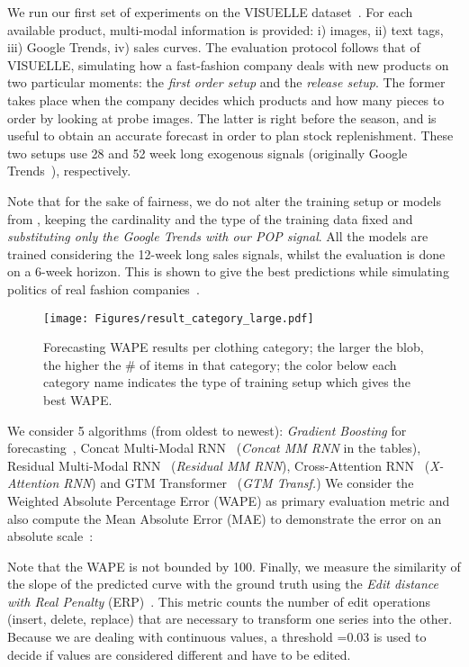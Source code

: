 \documentclass[runningheads]{llncs}
\newcommand{\snamebig}[0] {POP\xspace}
\begin{document}
We run our first set of experiments on the VISUELLE dataset~\cite{skenderi2021well}. For each available product, multi-modal information is provided: i) images, ii) text tags, iii) Google Trends, iv) sales curves. The evaluation protocol follows that of VISUELLE, simulating how a fast-fashion company deals with new products on two particular moments: the \emph{first order setup} and the \emph{release setup}. The former takes place when the company decides which products and how many pieces to order by looking at probe images. The latter is right before the season, and is useful to obtain an accurate forecast in order to plan stock replenishment. These two setups use 28 and 52 week long exogenous signals (originally Google Trends~\cite{skenderi2021well}), respectively.

Note that for the sake of fairness, we do not alter the training setup or models from \cite{skenderi2021well}, keeping the cardinality and the type of the training data fixed and \emph{substituting only the Google Trends with our \snamebig signal}. All the models are trained considering the 12-week long sales signals, whilst the evaluation is done on a 6-week horizon. This is shown to give the best predictions while simulating politics of real fashion companies~\cite{skenderi2021well}.


\begin{figure}
\centering
    \texttt{[image: Figures/result\_category\_large.pdf]}
\caption{\footnotesize Forecasting WAPE results per clothing category; the larger the blob, the higher the \# of items in that category; the color below each category name indicates the type of training setup which gives the best WAPE.}
    \label{fig:result_categories}
\end{figure}

We consider 5 algorithms (from oldest to newest): \emph{Gradient Boosting} for forecasting~\cite{ilic2021explainable}, Concat Multi-Modal RNN~\cite{ekambaram_attention_2020}  (\emph{Concat MM RNN} in the tables),  Residual Multi-Modal RNN~\cite{ekambaram_attention_2020} (\emph{Residual MM RNN}), Cross-Attention RNN~\cite{ekambaram_attention_2020} (\emph{X-Attention RNN}) and GTM Transformer~\cite{skenderi2021well} (\emph{GTM Transf.}) We consider the Weighted Absolute Percentage Error (WAPE) as primary evaluation metric and also compute the Mean Absolute Error (MAE) to demonstrate the error on an absolute scale~\cite{skenderi2021well}:



Note that the WAPE is not bounded by 100. Finally, we measure the similarity of the slope of the predicted curve with the ground truth using the \emph{Edit distance with Real Penalty} (ERP)~\cite{chen2004marriage}. This metric counts the number of edit operations (insert, delete, replace) that are necessary to transform one series into the other. Because we are dealing with continuous values, a threshold =0.03 is used to decide if values are considered different and have to be edited.
\end{document}
